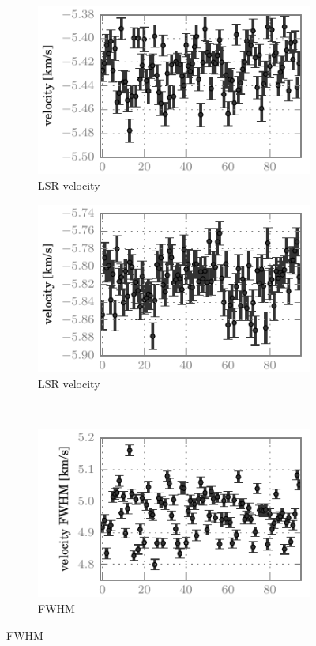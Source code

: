 \begin{figure}[hbtp]
    \centering
    \begin{subfigure}[b]{0.5\textwidth}
        \includegraphics{co87_core_velo}
        \caption{ LSR velocity}
    \end{subfigure}%
    \begin{subfigure}[b]{0.5\textwidth}
        \includegraphics{co98_core_velo}
        \caption{ LSR velocity}
    \end{subfigure}%
    \\
    \begin{subfigure}[b]{0.5\textwidth}
        \includegraphics{co87_core_vfwh}
        \caption{ FWHM}
    \end{subfigure}%

\end{figure}
